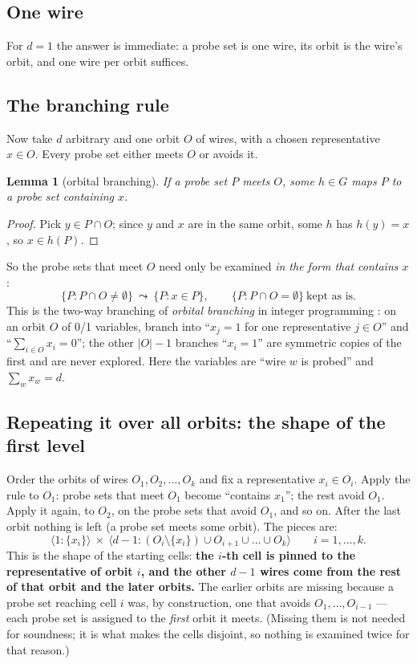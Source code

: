 \documentclass[11pt,a4paper]{article}
\newtheorem{lemma}[theorem]{Lemma}
\theoremstyle{definition}
\theoremstyle{remark}
\newcommand{\cellof}[2]{\langle #1 \mathbin{:} #2\rangle}
\begin{document}
\subsection{One wire}

For $d=1$ the answer is immediate: a probe set is one wire, its orbit is the wire's orbit,
and one wire per orbit suffices.

\subsection{The branching rule}

Now take $d$ arbitrary and one orbit $O$ of wires, with a chosen representative $x\in O$.
Every probe set either meets $O$ or avoids it.

\begin{lemma}[orbital branching]\label{lem:ob}
If a probe set $P$ meets $O$, some $h\in G$ maps $P$ to a probe set containing $x$.
\end{lemma}
\begin{proof}
Pick $y\in P\cap O$; since $y$ and $x$ are in the same orbit, some $h$ has $h(y)=x$, so
$x\in h(P)$.
\end{proof}

So the probe sets that meet $O$ need only be examined \emph{in the form that contains $x$}:
\[
\{P : P\cap O\neq\emptyset\}\ \leadsto\ \{P : x\in P\}, \qquad
\{P : P\cap O=\emptyset\}\ \text{kept as is.}
\]
This is the two-way branching of \emph{orbital branching} in integer programming
\cite{Ostrowski}: on an orbit $O$ of 0/1 variables, branch into ``$x_j = 1$ for one
representative $j\in O$'' and ``$\sum_{i\in O} x_i = 0$''; the other $|O|-1$ branches
``$x_i=1$'' are symmetric copies of the first and are never explored.  Here the variables
are ``wire $w$ is probed'' and $\sum_w x_w = d$.

\subsection{Repeating it over all orbits: the shape of the first level}

Order the orbits of wires $O_1, O_2, \dots, O_k$ and fix a representative $x_i\in O_i$.
Apply the rule to $O_1$: probe sets that meet $O_1$ become ``contains $x_1$''; the rest avoid
$O_1$.  Apply it again, to $O_2$, on the probe sets that avoid $O_1$, and so on.  After the
last orbit nothing is left (a probe set meets some orbit).  The pieces are:
\[
\boxed{\ \cellof{1}{\{x_i\}}\ \times\ \cellof{d-1}{(O_i\setminus\{x_i\})\cup O_{i+1}\cup\dots\cup O_k}\qquad i=1,\dots,k.\ }
\]
This is the shape of the starting cells: \textbf{the $i$-th cell is pinned to the
representative of orbit $i$, and the other $d-1$ wires come from the rest of that orbit and
the later orbits.}  The earlier orbits are missing because a probe set reaching cell $i$
was, by construction, one that avoids $O_1,\dots,O_{i-1}$ --- each probe set is assigned to
the \emph{first} orbit it meets.  (Missing them is not needed for soundness; it is what makes
the cells disjoint, so nothing is examined twice for that reason.)
\end{document}

